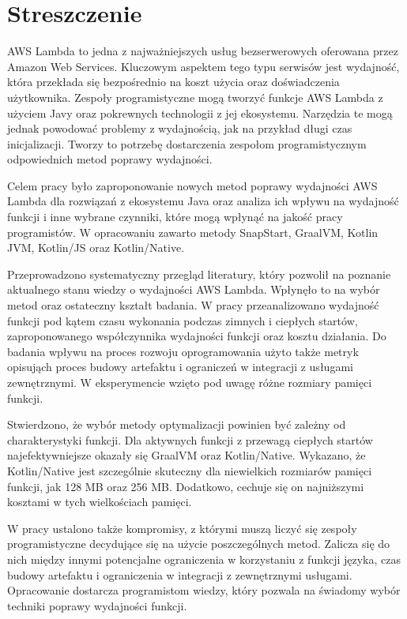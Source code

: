 \section*{Streszczenie}

AWS Lambda to jedna z najważniejszych usług bezserwerowych oferowana przez Amazon Web Services.
Kluczowym aspektem tego typu serwisów jest wydajność, która przekłada się bezpośrednio na koszt użycia oraz doświadczenia użytkownika.
Zespoły programistyczne mogą tworzyć funkcje AWS Lambda z użyciem Javy oraz pokrewnych technologii z jej ekosystemu.
Narzędzia te mogą jednak powodować problemy z wydajnością, jak na przykład długi czas inicjalizacji.
Tworzy to potrzebę dostarczenia zespołom programistycznym odpowiednich metod poprawy wydajności.

Celem pracy było zaproponowanie nowych metod poprawy wydajności AWS Lambda dla rozwiązań z ekosystemu Java oraz analiza ich wpływu na wydajność funkcji i inne wybrane czynniki, które mogą wpłynąć na jakość pracy programistów.
W opracowaniu zawarto metody SnapStart, GraalVM, Kotlin JVM, Kotlin/JS oraz Kotlin/Native.

Przeprowadzono systematyczny przegląd literatury, który pozwolił na poznanie aktualnego stanu wiedzy o wydajności AWS Lambda.
Wpłynęło to na wybór metod oraz ostateczny kształt badania.
W pracy przeanalizowano wydajność funkcji pod kątem czasu wykonania podczas zimnych i ciepłych startów, zaproponowanego współczynnika wydajności funkcji oraz kosztu działania.
Do badania wpływu na proces rozwoju oprogramowania użyto także metryk opisująch proces budowy artefaktu i ograniczeń w integracji z usługami zewnętrznymi.
W eksperymencie wzięto pod uwagę różne rozmiary pamięci funkcji.

Stwierdzono, że wybór metody optymalizacji powinien być zależny od charakterystyki funkcji.
Dla aktywnych funkcji z przewagą ciepłych startów najefektywniejsze okazały się GraalVM oraz Kotlin/Native.
Wykazano, że Kotlin/Native jest szczególnie skuteczny dla niewielkich rozmiarów pamięci funkcji, jak 128 MB oraz 256 MB.
Dodatkowo, cechuje się on najniższymi kosztami w tych wielkościach pamięci.

W pracy ustalono także kompromisy, z którymi muszą liczyć się zespoły programistyczne decydujące się na użycie poszczególnych metod.
Zalicza się do nich między innymi potencjalne ograniczenia w korzystaniu z funkcji języka, czas budowy artefaktu i ograniczenia w integracji z zewnętrznymi usługami.
Opracowanie dostarcza programistom wiedzy, który pozwala na świadomy wybór techniki poprawy wydajności funkcji.

